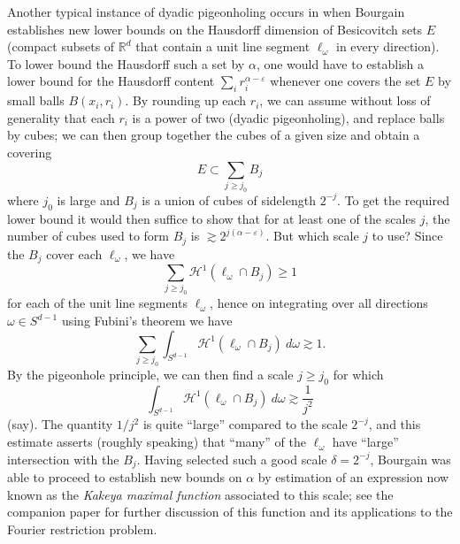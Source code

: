 \documentclass[12pt,a4paper,reqno]{amsart}
\numberwithin{equation}{section}
\theoremstyle{plain}
\theoremstyle{definition}
\newcommand\R{\mathbb{R}}
\newcommand\eps{\varepsilon}
\begin{document}
Another typical instance of dyadic pigeonholing occurs in \cite[Lemma 2.15]{besicovitch} when Bourgain establishes new lower bounds on the Hausdorff dimension of Besicovitch sets $E$ (compact subsets of $\R^d$ that contain a unit line segment $\ell_\omega$ in every direction).  To lower bound the Hausdorff such a set by $\alpha$, one would have to establish a lower bound for the Hausdorff content $\sum_i r_i^{\alpha-\eps}$ whenever one covers the set $E$ by small balls $B(x_i,r_i)$.  By rounding up each $r_i$, we can assume without loss of generality that each $r_i$ is a power of two (dyadic pigeonholing), and replace balls by cubes; we can then group together the cubes of a given size and obtain a covering
$$ E \subset \sum_{j \geq j_0} B_j$$
where $j_0$ is large and $B_j$ is a union of cubes of sidelength $2^{-j}$.  To get the required lower bound it would then suffice to show that for at least one of the scales $j$, the number of cubes used to form $B_j$ is $\gtrsim 2^{j(\alpha-\eps)}$.  But which scale $j$ to use?  Since the $B_j$ cover each $\ell_\omega$, we have
$$ \sum_{j \geq j_0} {\mathcal H}^1( \ell_\omega \cap B_j ) \geq 1$$
for each of the unit line segments $\ell_\omega$, hence on integrating over all directions $\omega \in S^{d-1}$ using Fubini's theorem we have
$$ \sum_{j \geq j_0} \int_{S^{d-1}} {\mathcal H}^1( \ell_\omega \cap B_j )\ d\omega \gtrsim 1.$$
By the pigeonhole principle, we can then find a scale $j \geq j_0$ for which
$$ \int_{S^{d-1}} {\mathcal H}^1( \ell_\omega \cap B_j )\ d\omega \gtrsim \frac{1}{j^2}$$
(say).  The quantity $1/j^2$ is quite ``large'' compared to the scale $2^{-j}$, and this estimate asserts (roughly speaking) that ``many'' of the $\ell_\omega$ have ``large'' intersection with the $B_j$.  Having selected such a good scale $\delta = 2^{-j}$, Bourgain was able to proceed to establish new bounds on $\alpha$ by estimation of an expression now known as the \emph{Kakeya maximal function} associated to this scale; see the companion paper \cite{demeter} for further discussion of this function and its applications to the Fourier restriction problem.
\end{document}
